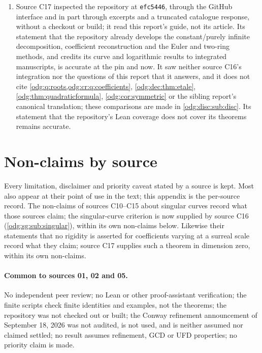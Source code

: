 \documentclass[11pt,oneside]{article}
\numberwithin{equation}{section}
\theoremstyle{definition}
\theoremstyle{remark}
\begin{document}
\begin{enumerate}[leftmargin=*]
are made in \cref{odg:sg:sub:singular}. Its statement that its results are not
Lean-verified remains accurate.
\item Source C17 inspected the repository at \texttt{efc5446}, through the GitHub interface
and in part through excerpts and a truncated catalogue response, without a checkout or
build; it read this report's guide, not its article. Its statement that the repository
already develops the constant/purely infinite decomposition, coefficient reconstruction and
the Euler and two-ring methods, and credits its curve and logarithmic results to integrated
manuscripts, is accurate at the pin and now. It saw neither source C16's integration nor
the questions of this report that it answers, and it does not cite
\cref{odg:q:roots,odg:cr:q:coefficients}, \cref{odg:dec:thm:etale},
\cref{odg:thm:quadraticformula}, \cref{odg:cor:symmetric} or the sibling report's canonical
translation; these comparisons are made in \cref{odg:disc:sub:disc}. Its statement that the
repository's Lean coverage does not cover its theorems remains accurate.
\end{enumerate}

\section{Non-claims by source}\label{odg:app:nonclaims}

Every limitation, disclaimer and priority caveat stated by a source is kept.
Most also appear at their point of use in the text; this appendix is the
per-source record. The non-claims of sources C10--C15 about singular curves record
what those sources claim; the singular-curve criterion is now supplied by source C16
(\cref{odg:sg:sub:singular}), within its own non-claims below. Likewise their statements
that no rigidity is asserted for coefficients varying at a surreal scale record what they
claim; source C17 supplies such a theorem in dimension zero, within its own non-claims.

\paragraph{Common to sources 01, 02 and 05.} No independent peer review; no Lean
or other proof-assistant verification; the finite scripts check finite
identities and examples, not the theorems; the repository was not checked out
or built; the Conway refinement announcement of September 18, 2026 was not
audited, is not used, and is neither assumed nor claimed settled; no result
assumes refinement, GCD or UFD properties; no priority claim is made.
\end{document}
